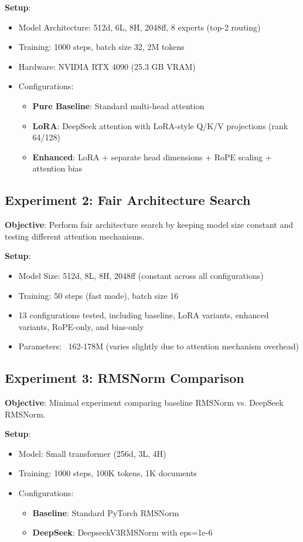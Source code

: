 \documentclass[11pt,a4paper]{article}
\begin{document}
\textbf{Setup}:
\begin{itemize}
    \item Model Architecture: 512d, 6L, 8H, 2048ff, 8 experts (top-2 routing)
    \item Training: 1000 steps, batch size 32, 2M tokens
    \item Hardware: NVIDIA RTX 4090 (25.3 GB VRAM)
    \item Configurations:
    \begin{itemize}
        \item \textbf{Pure Baseline}: Standard multi-head attention
        \item \textbf{LoRA}: DeepSeek attention with LoRA-style Q/K/V projections (rank 64/128)
        \item \textbf{Enhanced}: LoRA + separate head dimensions + RoPE scaling + attention bias
    \end{itemize}
\end{itemize}

\subsection{Experiment 2: Fair Architecture Search}

\textbf{Objective}: Perform fair architecture search by keeping model size constant and testing different attention mechanisms.

\textbf{Setup}:
\begin{itemize}
    \item Model Size: 512d, 8L, 8H, 2048ff (constant across all configurations)
    \item Training: 50 steps (fast mode), batch size 16
    \item 13 configurations tested, including baseline, LoRA variants, enhanced variants, RoPE-only, and bias-only
    \item Parameters: ~162-178M (varies slightly due to attention mechanism overhead)
\end{itemize}

\subsection{Experiment 3: RMSNorm Comparison}

\textbf{Objective}: Minimal experiment comparing baseline RMSNorm vs. DeepSeek RMSNorm.

\textbf{Setup}:
\begin{itemize}
    \item Model: Small transformer (256d, 3L, 4H)
    \item Training: 1000 steps, 100K tokens, 1K documents
    \item Configurations:
    \begin{itemize}
        \item \textbf{Baseline}: Standard PyTorch RMSNorm
        \item \textbf{DeepSeek}: DeepseekV3RMSNorm with eps=1e-6
    \end{itemize}
\end{itemize}
\end{document}
